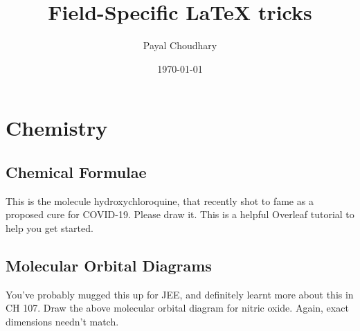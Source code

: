 \documentclass{article}
\title{Field-Specific \LaTeX{} tricks }
\author{Payal Choudhary }
\date{\today}
\begin{document}
\maketitle

\tableofcontents

\newpage

\section{Chemistry}
\subsection{Chemical Formulae}
\vspace{0.5cm}



\begin{flushleft}
This is the molecule hydroxychloroquine, that recently shot to fame as a proposed cure for COVID-19. Please draw it. This
is a helpful Overleaf tutorial to help you get started.
\end{flushleft}


\subsection{Molecular Orbital Diagrams}
\begin{MOdiagram}
\end{MOdiagram}

\vspace{0.5cm}
\begin{flushleft}
You’ve probably mugged this up for JEE, and definitely learnt more about this in CH 107.
Draw the above molecular orbital diagram for nitric oxide. Again, exact dimensions needn’t match.
\end{flushleft}
\end{document}
